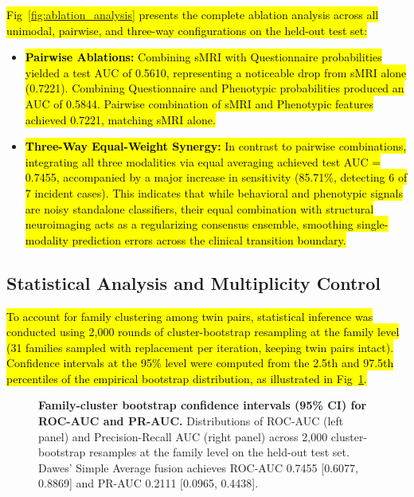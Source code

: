 \documentclass[10pt,letterpaper]{article}
\begin{document}
\hl{Fig~\ref{fig:ablation_analysis} presents the complete ablation analysis across all unimodal, pairwise, and three-way configurations on the held-out test set:}
\begin{itemize}
    \item \hl{\textbf{Pairwise Ablations:} Combining sMRI with Questionnaire probabilities yielded a test AUC of 0.5610, representing a noticeable drop from sMRI alone (0.7221). Combining Questionnaire and Phenotypic probabilities produced an AUC of 0.5844. Pairwise combination of sMRI and Phenotypic features achieved 0.7221, matching sMRI alone.}
    \item \hl{\textbf{Three-Way Equal-Weight Synergy:} In contrast to pairwise combinations, integrating all three modalities via equal averaging achieved test AUC = 0.7455, accompanied by a major increase in sensitivity (85.71\%, detecting 6 of 7 incident cases). This indicates that while behavioral and phenotypic signals are noisy standalone classifiers, their equal combination with structural neuroimaging acts as a regularizing consensus ensemble, smoothing single-modality prediction errors across the clinical transition boundary.}
\end{itemize}

\subsection*{Statistical Analysis and Multiplicity Control}

\hl{To account for family clustering among twin pairs, statistical inference was conducted using 2,000 rounds of cluster-bootstrap resampling at the family level (31 families sampled with replacement per iteration, keeping twin pairs intact). Confidence intervals at the 95\% level were computed from the 2.5th and 97.5th percentiles of the empirical bootstrap distribution, as illustrated in Fig~\ref{fig:ci_barplot}.}

\begin{figure}[!h]
\caption{\textbf{Family-cluster bootstrap confidence intervals (95\% CI) for ROC-AUC and PR-AUC.}
Distributions of ROC-AUC (left panel) and Precision-Recall AUC (right panel) across 2,000 cluster-bootstrap resamples at the family level on the held-out test set. Dawes' Simple Average fusion achieves ROC-AUC 0.7455 [0.6077, 0.8869] and PR-AUC 0.2111 [0.0965, 0.4438].}
\label{fig:ci_barplot}
\end{figure}
\end{document}
